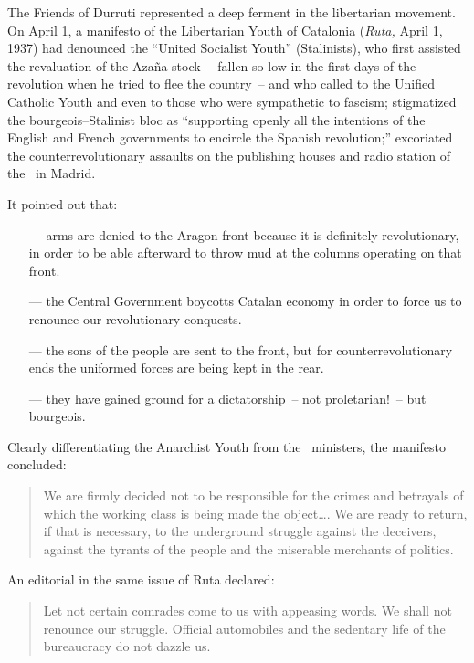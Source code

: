 The Friends of Durruti represented a deep ferment in the libertarian movement. On April 1, a manifesto of the Libertarian Youth of Catalonia (\emph{Ruta,} April 1, 1937) had denounced the ``United Socialist Youth'' (Stalinists), who first assisted the revaluation of the Azaña stock~-- fallen so low in the first days of the revolution when he tried to flee the country~-- and who called to the Unified Catholic Youth and even to those who were sympathetic to fascism; stigmatized the bourgeois--Stalinist bloc as ``supporting openly all the intentions of the English and French governments to encircle the Spanish revolution;'' excoriated the counterrevolutionary assaults on the publishing houses and radio station of the \POUM\ in Madrid. 

\bigskip

It pointed out that:

\begin{itemize}
  \item[—] arms are denied to the Aragon front because it is definitely revolutionary, in order to be able afterward to throw mud at the columns operating on that front.
	
  \item[—] the Central Government boycotts Catalan economy in order to force us to renounce our revolutionary conquests.
	
  \item[—] the sons of the people are sent to the front, but for coun\-ter\-rev\-o\-lu\-tion\-ary ends the uniformed forces are being kept in the rear.
  
  \item[—] they have gained ground for a dictatorship~-- not pro\-le\-ta\-ri\-an!~-- but bourgeois.
\end{itemize}

Clearly differentiating the Anarchist Youth from the \CNT\ ministers, the manifesto concluded:

\begin{quotation}
  We are firmly decided not to be responsible for the crimes and betrayals of which the working class is being made the object\dots. We are ready to return, if that is necessary, to the underground struggle against the deceivers, against the tyrants of the people and the miserable merchants of politics.
\end{quotation}

An editorial in the same issue of Ruta declared:

\begin{quotation}
  Let not certain comrades come to us with appeasing words. We shall not renounce our struggle. Official automobiles and the sedentary life of the bureaucracy do not dazzle us.
\end{quotation} 

